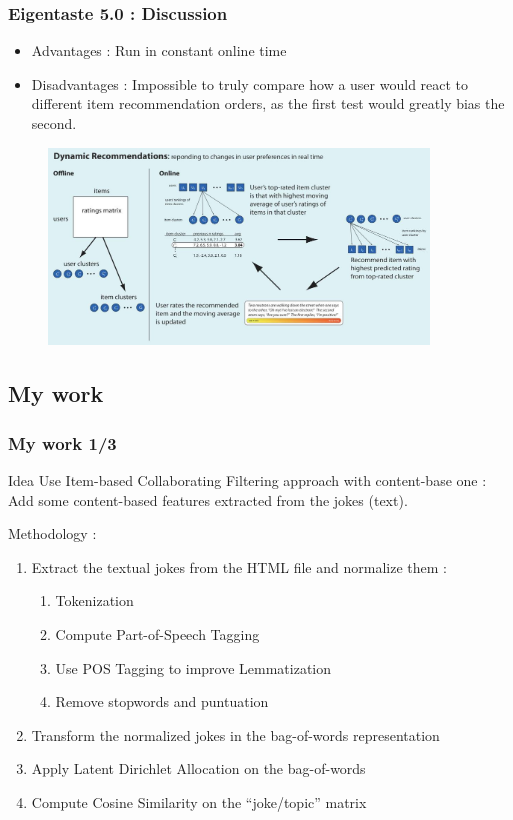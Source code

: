 \documentclass[10pt,handout,english]{beamer}
\begin{document}
			\begin{frame}
			\frametitle{Eigentaste 5.0 : Discussion}
				\begin{itemize}
					\item Advantages :
						Run in constant online time
					\item Disadvantages :
						Impossible to truly compare how a user would react to different item recommendation orders, as the first test would greatly bias the second.
				\end{itemize}
				\begin{figure}[h!]
	            	\centering
	                \includegraphics[width=0.9\textwidth]{eigentaste.jpg}
	            \end{figure}

			\end{frame}

		\subsection{My work}
			\begin{frame}
			\frametitle{My work 1/3}
				\begin{block}{Idea}
					Use Item-based Collaborating Filtering approach with content-base one :\\
					Add some content-based features extracted from the jokes (text).
				\end{block}
				Methodology :
				\begin{enumerate}
					\item Extract the textual jokes from the HTML file and normalize them :
					\begin{enumerate}
						\item Tokenization
						\item Compute Part-of-Speech Tagging
						\item Use POS Tagging to improve Lemmatization
						\item Remove stopwords and puntuation
					\end{enumerate}
					\item Transform the normalized jokes in the bag-of-words representation
					\item Apply Latent Dirichlet Allocation on the bag-of-words
					\item Compute Cosine Similarity on the ``joke/topic'' matrix
				\end{enumerate}

			\end{frame}
\end{document}
